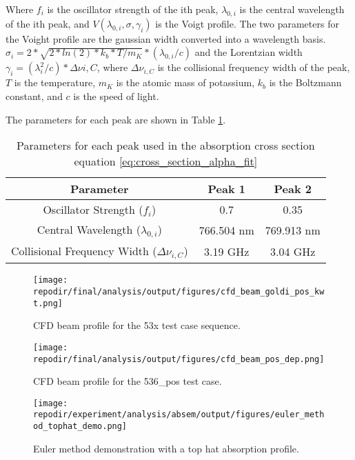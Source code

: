 Where $f_i$ is the oscillator strength of the ith peak, $\lambda_{0,i}$ is the central wavelength of the ith peak, and $V(\lambda_{0,i},\sigma,\gamma_i)$ is the Voigt profile. The two parameters for the Voight profile are the gaussian width converted into a wavelength basis.  $\sigma_i = 2*\sqrt{2*ln(2)*k_b*T/m_K}*(\lambda_{0,i}/c)$ and the Lorentzian width $\gamma_i = (\lambda_i^2/c)*\Delta \nu{i,C}$, where $\Delta \nu_{i,C}$ is the collisional frequency width of the peak, $T$ is the temperature, $m_K$ is the atomic mass of potassium, $k_b$ is the Boltzmann constant, and $c$ is the speed of light.

The parameters for each peak are shown in Table \ref{table:peak_parameters}. 

\begin{table}[H]
\centering
\begin{tabular}{|c|c|c|}
\hline
Parameter & Peak 1 & Peak 2 \\
\hline
Oscillator Strength ($f_i$) & 0.7 & 0.35 \\
Central Wavelength ($\lambda_{0,i}$) & 766.504 nm & 769.913 nm \\
Collisional Frequency Width ($\Delta \nu_{i,C}$) & 3.19 GHz & 3.04 GHz \\
\hline
\end{tabular}
\caption{Parameters for each peak used in the absorption cross section equation \ref{eq:cross_section_alpha_fit}}
\label{table:peak_parameters}
\end{table}


\begin{figure}[]
    \centering
    \texttt{[image: \\repodir/final/analysis/output/figures/cfd\_beam\_goldi\_pos\_kwt.png]}
    \caption{CFD beam profile for the 53x test case sequence.}
    \label{fig:SI_cfd_beam_goldi_pos_kwt}

    \texttt{[image: \\repodir/final/analysis/output/figures/cfd\_beam\_pos\_dep.png]}
    \caption{CFD beam profile for the 536\_pos test case.}
    \label{fig:SI_cfd_beam_pos_dep}
\end{figure}


\begin{figure}[]
    \centering
    \texttt{[image: \\repodir/experiment/analysis/absem/output/figures/euler\_method\_tophat\_demo.png]}
    \caption{Euler method demonstration with a top hat absorption profile.}
    \label{fig:SI_euler_method_tophat_demo}
\end{figure}

